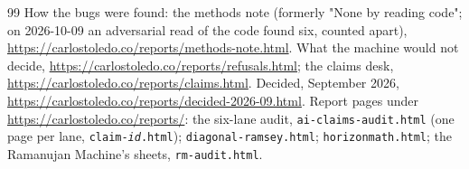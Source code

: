 \documentclass[11pt]{article}
\theoremstyle{plain}
\theoremstyle{definition}
\begin{document}
\begin{thebibliography}{99}
 How the bugs were found: the methods note (formerly "None by reading code"; on 2026-10-09 an adversarial read of the code found six, counted apart), \url{https://carlostoledo.co/reports/methods-note.html}.
 What the machine would not decide, \url{https://carlostoledo.co/reports/refusals.html}; the claims desk, \url{https://carlostoledo.co/reports/claims.html}.
 Decided, September 2026, \url{https://carlostoledo.co/reports/decided-2026-09.html}.
 Report pages under \url{https://carlostoledo.co/reports/}: the six-lane audit, \texttt{ai-claims-audit.html} (one page per lane, \texttt{claim-\textit{id}.html}); \texttt{diagonal-ramsey.html}; \texttt{horizonmath.html}; the Ramanujan Machine's sheets, \texttt{rm-audit.html}.
\end{thebibliography}
\end{document}
